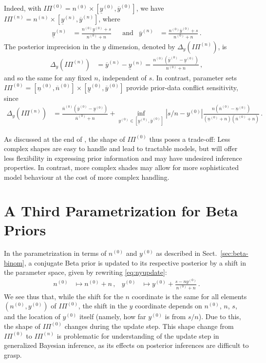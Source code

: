 \documentclass[runningheads,a4paper]{llncs}
\newcommand{\uz}{^{(0)}} %
\newcommand{\un}{^{(n)}} %
\newcommand{\ul}[1]{\underline{#1}}
\newcommand{\ol}[1]{\overline{#1}}
\def\yz{y\uz}
\def\yn{y\un}
\def\yzl{\ul{y}\uz}
\def\yzu{\ol{y}\uz}
\def\ynl{\ul{y}\un}
\def\ynu{\ol{y}\un}
\def\nz{n\uz}
\def\nn{n\un}
\def\nzl{\ul{n}\uz}
\def\nzu{\ol{n}\uz}
\def\PZ{I\!\!\Pi\uz}
\def\PN{I\!\!\Pi\un}
\begin{document}
Indeed, with $\PZ = \nz \times [\yzl, \yzu]$, we have $\PN = \nn \times [\ynl, \ynu]$, where
\begin{align*}
\ynl &= \frac{\nz\yzl + s}{\nz + n} & &\text{and} &
\ynu &= \frac{\nz\yzu + s}{\nz + n}\,.
\end{align*}
The posterior imprecision in the $y$ dimension, denoted by $\Delta_y(\PN)$, is 
\begin{align*}
\Delta_y(\PN) &= \ynu - \ynl = \frac{\nz (\yzu - \yzl)}{\nz +n}\,,
\end{align*}
and so the same for any fixed $n$, independent of $s$.
In contrast, parameter sets $\PZ = [\nzl, \nzu] \times [\yzl, \yzu]$
provide prior-data conflict sensitivity, since
\begin{align*}
\Delta_y(\PN) &= \frac{\nzu (\yzu - \yzl)}{\nzu + n} %
               + \inf_{\yz \in [\yzl,\yzu]} |s/n - \yz| \frac{n (\nzu - \nzl)}{(\nzl + n)(\nzu + n)}\,.
\end{align*}

As discussed at the end of \cite[\S 3.1.4]{2013:diss-gw},
the shape of $\PZ$ thus poses a trade-off:
Less complex shapes are easy to handle and lead to tractable models,
but will offer less flexibility in expressing prior information
and may have undesired inference properties.
In contrast, more complex shades may allow for more sophisticated model behaviour
at the cost of more complex handling.


\section{A Third Parametrization for Beta Priors}
\label{sec:miksworld}

In the parametrization in terms of $\nz$ and $\yz$ as described in Sect.~\ref{sec:beta-binom},
a conjugate Beta prior is updated to its respective posterior by a shift in the parameter space,
given by rewriting \eqref{eq:nyupdate}:
\begin{align*}
\nz &\mapsto \nz + n\,, &
\yz &\mapsto %
             \yz + \frac{s - n \yz}{\nz+n}\,.
\end{align*}
We see thus that, while the shift for the $n$ coordinate is the same for all elements $(\nz,\yz)$ of $\PZ$,
the shift in the $y$ coordinate depends on $\nz$, $n$, $s$, and the location of $\yz$ itself
(namely, how far $\yz$ is from $s/n$).
Due to this, the shape of $\PZ$ changes during the update step.
This shape change from $\PZ$ to $\PN$ is problematic for understanding of the update step in generalized Bayesian inference,
as its effects on posterior inferences are difficult to grasp.
\end{document}
